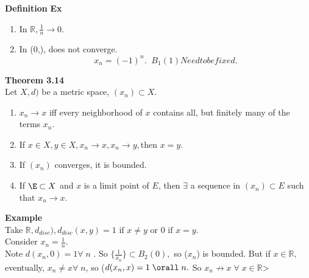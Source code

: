 \documentclass[12pt]{article}
\begin{document}
\begin{block}{\bf Definition}
\textbf{Ex}
\begin{enumerate}[label=(\roman*)]
    \item In $\mathbb{R}, \frac{1}{n} \rightarrow 0$.
    \item In (0,\infty),  does not converge.
        $$
        x_n = (-1)^n.\;\; B_1(1) Need to be fixed.
        $$
 \end{enumerate}
 
 \textbf{Theorem 3.14}\\
 Let $X,d)$ be a metric space, $(x_n) \subset X.$
 \begin{enumerate}[label=(\roman*)]
     \item  $x_n \rightarrow x$ iff every neighborhood of $x$ contains all, but finitely many of the terms $x_n$.
     \item If $x\in X, y\in X, x_n \rightarrow x, x_n\rightarrow y, $then $x=y$.
     \item If $(x_n)$ converges, it is bounded.
     \item If $\E \subset X$ and $x$ is a limit point of $E$, then $\exists$ a sequence in $(x_n) \subset E$ such that $x_n \rightarrow x$.
 \end{enumerate}
 
 \textbf{Example}\\
 Take $\mathbb{R}, d_{disc}), d_{disc}(x,y) = 1 \text{ if } x \neq y \text{ or } 0 \text{ if } x=y$.\\
 Consider $x_n = \frac{1}{n}.$\\
 Note $d(x_n,0) = 1 \forall\; n$ . So $\{\frac{1}{x_n}\} \subset B_2(0),$ so ($x_n$) is bounded. But if $x\in \mathbb{R}, $ eventually, $x_n \neq x \forall\; n$, so ($d(x_n, x) = 1 \;\orall\;n.$ So $x_n \nrightarrow x\;\forall\;x\in\mathbb{R}$>

\end{block}
\end{document}
